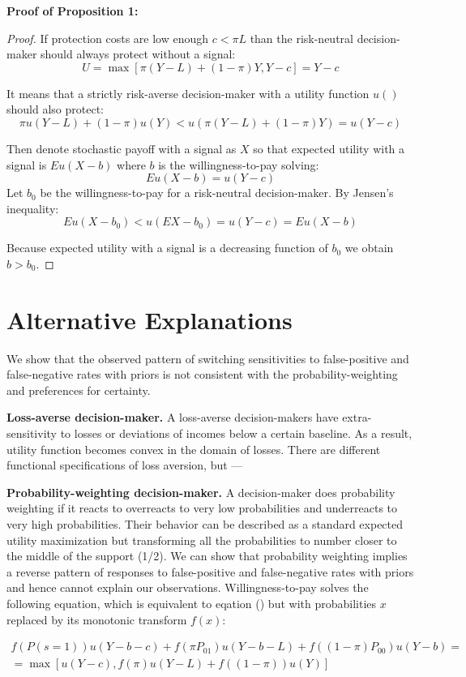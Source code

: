 \documentclass[12pt,a4paper]{article}
\begin{document}
\textbf{Proof of Proposition 1:} 
\begin{proof} If protection costs are low enough $c<\pi L$ than the risk-neutral decision-maker should always protect without a signal:
$$U=\max[\pi(Y-L)+(1-\pi)Y,Y-c]=Y-c$$

It means that a strictly risk-averse decision-maker with a utility function $u()$ should also protect:
$$\pi u(Y-L)+(1-\pi)u(Y)<u(\pi(Y-L)+(1-\pi)Y)=u(Y-c)$$

Then denote stochastic payoff with a signal as $X$ so that expected utility with a signal is $Eu(X-b)$ where $b$ is the willingness-to-pay solving:
$$Eu(X-b)=u(Y-c)$$
 Let $b_0$ be the willingness-to-pay for a risk-neutral decision-maker. By Jensen's inequality:
$$Eu(X-b_0)<u(EX-b_0)=u(Y-c)=Eu(X-b)$$

Because expected utility with a signal is a decreasing function of $b_0$ we obtain $b>b_0$. \end{proof}

\newpage
\section{Alternative Explanations}

We show that the observed pattern of switching sensitivities to false-positive and false-negative rates with priors is not consistent with the probability-weighting and preferences for certainty.  

\textbf{Loss-averse decision-maker.} A loss-averse decision-makers have extra-sensitivity to losses or deviations of incomes below a certain baseline. As a result, utility function becomes convex in the domain of losses. There are different functional specifications of loss aversion, but ---

\textbf{Probability-weighting decision-maker.} A decision-maker does probability weighting if it reacts to overreacts to very low probabilities and underreacts to very high probabilities. Their behavior can be described as a standard expected utility maximization but transforming all the probabilities to number closer to the middle of the support (1/2). We can show that probability weighting implies a reverse pattern of responses to false-positive and false-negative rates with priors and hence cannot explain our observations. Willingness-to-pay solves the following equation, which is equivalent to eqation () but with probabilities $x$ replaced by its monotonic transform $f(x)$:

\begin{equation}
\begin{split}
f(P(s=1))u(Y-b-c)+f(\pi P_{01})u(Y-b-L)+f((1-\pi)P_{00})u(Y-b)=\\=\max[u(Y-c),f(\pi) u(Y-L)+f((1-\pi)) u(Y)] 
\end{split}
\end{equation}
\end{document}
